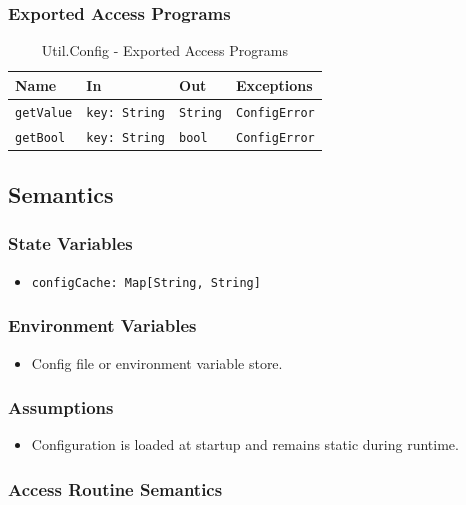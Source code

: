 \documentclass[12pt, titlepage]{article}
\begin{document}
\subsubsection{Exported Access Programs}

\begin{table}[H]
\centering
\small
\caption{Util.Config - Exported Access Programs}
\begin{tabular}{p{3.5cm} p{3.5cm} p{3.5cm} p{3.5cm}}
\toprule
\textbf{Name} & \textbf{In} & \textbf{Out} & \textbf{Exceptions} \\
\midrule
\texttt{getValue} & \texttt{key: String} & \texttt{String} & \texttt{ConfigError} \\
\texttt{getBool} & \texttt{key: String} & \texttt{bool} & \texttt{ConfigError} \\
\bottomrule
\end{tabular}
\end{table}

\subsection{Semantics}

\subsubsection{State Variables}
\begin{itemize}
    \item \texttt{configCache: Map[String, String]}
\end{itemize}

\subsubsection{Environment Variables}
\begin{itemize}
    \item Config file or environment variable store.
\end{itemize}

\subsubsection{Assumptions}
\begin{itemize}
    \item Configuration is loaded at startup and remains static during runtime.
\end{itemize}

\subsubsection{Access Routine Semantics}
\end{document}
